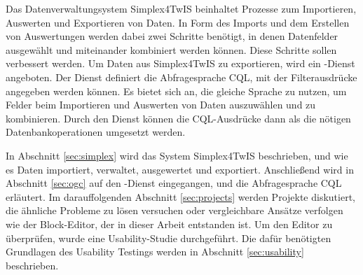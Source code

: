 \label{sec:theory}
Das Datenverwaltungsystem Simplex4TwIS beinhaltet Prozesse zum Importieren, Auswerten und Exportieren von Daten. In Form des Imports und dem Erstellen von Auswertungen werden dabei zwei Schritte benötigt, in denen Datenfelder ausgewählt und miteinander kombiniert werden können. Diese Schritte sollen verbessert werden. Um Daten aus Simplex4TwIS zu exportieren, wird ein \ogcapi-Dienst angeboten. Der Dienst definiert die Abfragesprache \ac{CQL}, mit der Filterausdrücke angegeben werden können. Es bietet sich an, die gleiche Sprache zu nutzen, um Felder beim Importieren und Auswerten von Daten auszuwählen und zu kombinieren. Durch den Dienst können die \ac{CQL}-Ausdrücke dann als die nötigen Datenbankoperationen umgesetzt werden.

In Abschnitt \ref{sec:simplex} wird das System Simplex4TwIS beschrieben, und wie es Daten importiert, verwaltet, ausgewertet und exportiert. Anschließend wird in Abschnitt \ref{sec:ogc} auf den \ogcapi-Dienst eingegangen, und die Abfragesprache \ac{CQL} erläutert. Im darauffolgenden Abschnitt \ref{sec:projects} werden Projekte diskutiert, die ähnliche Probleme zu lösen versuchen oder vergleichbare Ansätze verfolgen wie der Block-Editor, der in dieser Arbeit entstanden ist. Um den Editor zu überprüfen, wurde eine Usability-Studie durchgeführt. Die dafür benötigten Grundlagen des Usability Testings werden in Abschnitt \ref{sec:usability} beschrieben.
